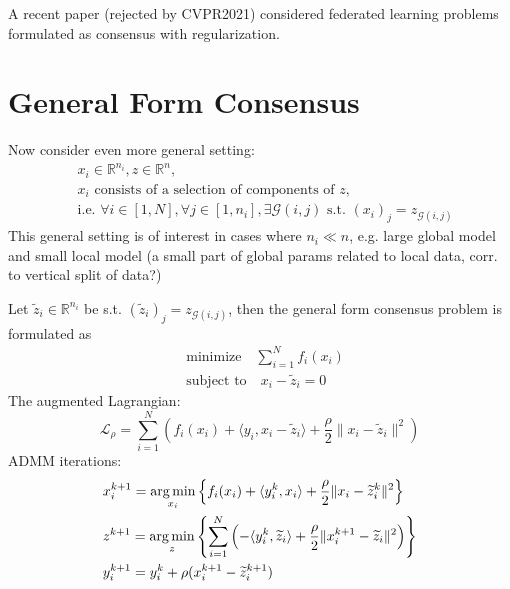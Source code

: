 \begin{remark}
A recent paper \cite{hanzely2020federated} (rejected by CVPR2021) considered federated learning problems formulated as consensus with regularization.
\end{remark}

\section{General Form Consensus}

Now consider even more general setting:
\begin{align*}
    & x_i \in \mathbb{R}^{n_i}, z \in \mathbb{R}^n, \\
    & \text{$x_i$ consists of a selection of components of $z$,} \\
    & \text{i.e. } \forall i \in [1,N], \forall j \in [1,n_i], \exists \mathcal{G}(i,j) \text{ s.t. } (x_i)_j = z_{\mathcal{G}(i,j)}
\end{align*}
This general setting is of interest in cases where $n_i \ll n$, e.g. large global model and small local model (a small part of global params related to local data, corr. to vertical split of data?)

Let $\widetilde{z}_i \in \mathbb{R}^{n_i}$ be s.t. $(\widetilde{z}_i)_j = z_{\mathcal{G}(i,j)}$, then the general form consensus problem is formulated as
\begin{align*}
    & \text{minimize} \quad \sum\limits_{i=1}^N f_i(x_i) \\
    & \text{subject to} \quad x_i - \widetilde{z}_i = 0
\end{align*}
The augmented Lagrangian:
$$\mathcal{L}_{\rho} = \sum\limits_{i=1}^N \left( f_i(x_i) + \langle y_i, x_i-\widetilde{z}_i \rangle + \dfrac{\rho}{2} \lVert  x_i - \widetilde{z}_i \rVert^2 \right)$$
ADMM iterations:
\begin{align*}
    & x_i^{k+1} = \operatorname*{arg\,min}_{x_i} \left\{ f_i(x_i) + \langle y_i^k, x_i \rangle + \dfrac{\rho}{2}\lVert x_i-\widetilde{z}_i^k \rVert^2 \right\} \\
    & z^{k+1} = \operatorname*{arg\,min}_{z} \left\{ \sum\limits_{i=1}^N \left( -\langle y_i^k, \widetilde{z}_i \rangle + \dfrac{\rho}{2}\lVert x_i^{k+1}-\widetilde{z}_i \rVert^2 \right) \right\} \\
    & y_i^{k+1} = y_i^k + \rho (x_i^{k+1} - \widetilde{z}_i^{k+1})
\end{align*}


